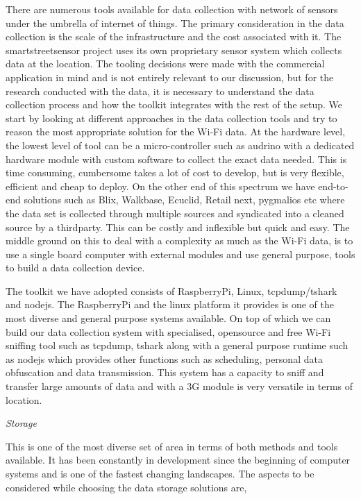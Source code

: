 There are numerous tools available for data collection with network of sensors under the umbrella of internet of things.
The primary consideration in the data collection is the scale of the infrastructure and the cost associated with it.
The smartstreetsensor project uses its own proprietary sensor system which collects data at the location.
The tooling decisions were made with the commercial application in mind and is not entirely relevant to our discussion, but for the research conducted with the data, it is necessary to understand the data collection process and how the toolkit integrates with the rest of the setup.
We start by looking at different approaches in the data collection tools and try to reason the most appropriate solution for the Wi-Fi data.
At the hardware level, the lowest level of tool can be a micro-controller such as audrino with a dedicated hardware module with custom software to collect the exact data needed.
This is time consuming, cumbersome takes a lot of cost to develop, but is very flexible, efficient and cheap to deploy.
On the other end of this spectrum we have end-to-end solutions such as Blix, Walkbase, Ecuclid, Retail next, pygmalios etc where the data set is collected through multiple sources and syndicated into a cleaned source by a thirdparty.
This can be costly and inflexible but quick and easy.
The middle ground on this to deal with a complexity as much as the Wi-Fi data, is to use a single board computer with external modules and use general purpose, tools to build a data collection device.

The toolkit we have adopted consists of RaspberryPi, Linux, tcpdump/tshark and nodejs.
The RaspberryPi and the linux platform it provides is one of the most diverse and general purpose systems available.
On top of which we can build our data collection system with specialised, opensource and free Wi-Fi sniffing tool such as tcpdump, tshark along with a general purpose runtime such as nodejs which provides other functions such as scheduling, personal data obfuscation and data transmission.
This system has a capacity to sniff and transfer large amounts of data and with a 3G module is very versatile in terms of location.


\vspace{1.5em}\noindent\textit{Storage}\vspace{0.5em}

This is one of the most diverse set of area in terms of both methods and tools available.
It has been constantly in development since the beginning of computer systems and is one of the fastest changing landscapes.
The aspects to be considered while choosing the data storage solutions are,

